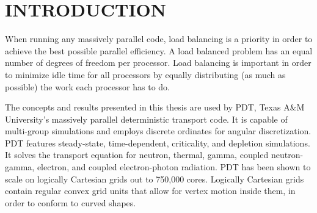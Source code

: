 %
%
%



\pagestyle{plain} %
\setcounter{page}{1}


\chapter{\uppercase {Introduction}}
\label{ch:introduction}
 
When running any massively parallel code, load balancing is a priority in order to achieve the best possible parallel efficiency. A load balanced problem has an equal number of degrees of freedom per processor. Load balancing is important in order to minimize idle time for all processors by equally distributing (as much as possible) the work each processor has to do.

The concepts and results presented in this thesis are used by PDT, Texas A\&M University's massively parallel deterministic transport code. It is capable of multi-group simulations and employs discrete ordinates for angular discretization. PDT features steady-state, time-dependent, criticality, and depletion simulations. It solves the transport equation for neutron, thermal, gamma, coupled neutron-gamma, electron, and coupled electron-photon radiation. PDT  has been shown to scale on logically Cartesian grids out to 750,000 cores. Logically Cartesian grids contain regular convex grid units that allow for vertex motion inside them, in order to conform to curved shapes. 

